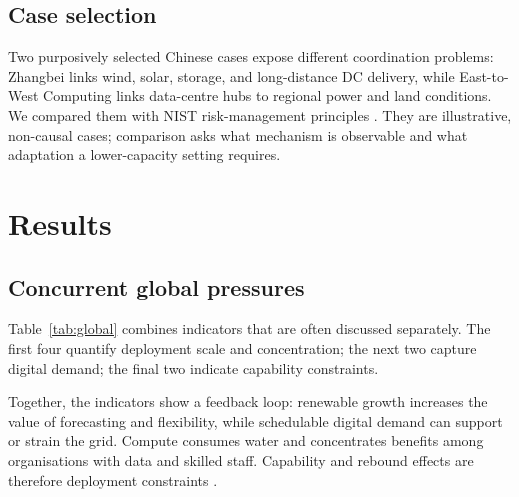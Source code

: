 \documentclass[12pt]{article}
\begin{document}
\subsection{Case selection}
Two purposively selected Chinese cases expose different coordination problems: Zhangbei links wind, solar, storage, and long-distance DC delivery, while East-to-West Computing links data-centre hubs to regional power and land conditions. We compared them with NIST risk-management principles \cite{nist2023}. They are illustrative, non-causal cases; comparison asks what mechanism is observable and what adaptation a lower-capacity setting requires.

\section{Results}

\subsection{Concurrent global pressures}
Table~\ref{tab:global} combines indicators that are often discussed separately. The first four quantify deployment scale and concentration; the next two capture digital demand; the final two indicate capability constraints.

Together, the indicators show a feedback loop: renewable growth increases the value of forecasting and flexibility, while schedulable digital demand can support or strain the grid. Compute consumes water and concentrates benefits among organisations with data and skilled staff. Capability and rebound effects are therefore deployment constraints \cite{iea2024electricity}.
\end{document}
